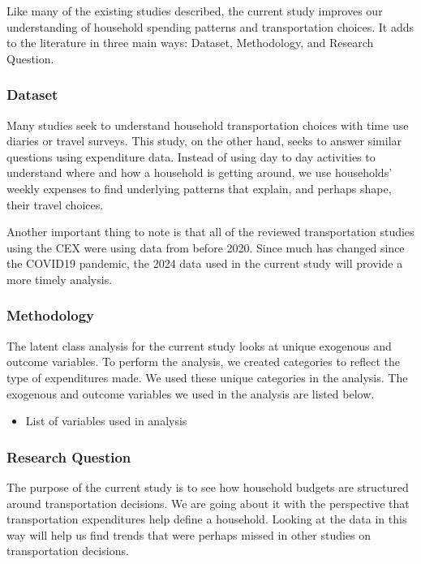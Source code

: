 \documentclass[
]{agujournal2019}
\providecommand{\tightlist}{%
  \setlength{\itemsep}{0pt}\setlength{\parskip}{0pt}}
\begin{document}
Like many of the existing studies described, the current study improves
our understanding of household spending patterns and transportation
choices. It adds to the literature in three main ways: Dataset,
Methodology, and Research Question.

\subsubsection{Dataset}\label{dataset}

Many studies seek to understand household transportation choices with
time use diaries or travel surveys. This study, on the other hand, seeks
to answer similar questions using expenditure data. Instead of using day
to day activities to understand where and how a household is getting
around, we use households' weekly expenses to find underlying patterns
that explain, and perhaps shape, their travel choices.

Another important thing to note is that all of the reviewed
transportation studies using the CEX were using data from before 2020.
Since much has changed since the COVID19 pandemic, the 2024 data used in
the current study will provide a more timely analysis.

\subsubsection{Methodology}\label{methodology}

The latent class analysis for the current study looks at unique
exogenous and outcome variables. To perform the analysis, we created
categories to reflect the type of expenditures made. We used these
unique categories in the analysis. The exogenous and outcome variables
we used in the analysis are listed below.

\begin{itemize}
\tightlist
\item
  List of variables used in analysis
\end{itemize}

\subsubsection{Research Question}\label{research-question}

The purpose of the current study is to see how household budgets are
structured around transportation decisions. We are going about it with
the perspective that transportation expenditures help define a
household. Looking at the data in this way will help us find trends that
were perhaps missed in other studies on transportation decisions.
\end{document}
